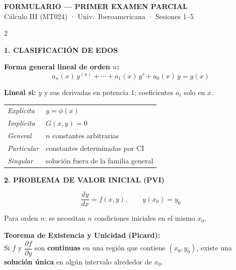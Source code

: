 \documentclass[10pt,letterpaper]{article}
\newcommand{\hdr}[2]{%
  \vspace{5pt}%
  \noindent\colorbox{#1}{\parbox{\dimexpr\linewidth-2\fboxsep}{%
    \vspace{2pt}\centering\textbf{\small\color{white}\MakeUppercase{#2}}\vspace{2pt}%
  }}\par\vspace{4pt}}
\newenvironment{caja}[1][ibero]{%
  \begin{mdframed}[linecolor=#1,linewidth=1pt,backgroundcolor=#1!8,
    innerleftmargin=5pt,innerrightmargin=5pt,
    innertopmargin=3pt,innerbottommargin=3pt,
    skipabove=4pt,skipbelow=4pt]
}{\end{mdframed}}
\begin{document}
\pagestyle{empty}

\noindent\colorbox{ibero}{\parbox{\linewidth}{%
  \vspace{4pt}\centering
  {\large\bfseries\color{white}FORMULARIO — PRIMER EXAMEN PARCIAL}\\[2pt]
  {\small\color{white}Cálculo III (MT024) · Univ.\ Iberoamericana · Sesiones 1–5}
  \vspace{4pt}}}

\vspace{6pt}

\begin{multicols}{2}

\hdr{ibero}{1. Clasificación de EDOs}

\textbf{Forma general lineal de orden $n$:}
\[
  a_n(x)\,y^{(n)} + \cdots + a_1(x)\,y' + a_0(x)\,y = g(x)
\]

\textbf{Lineal si:} $y$ y sus derivadas en potencia 1; coeficientes $a_i$ solo en $x$.

\medskip
\begin{tabular}{@{}ll@{}}
  \textit{Explícita}  & $y = \phi(x)$ \\
  \textit{Implícita}  & $G(x,y) = 0$ \\
  \textit{General}    & $n$ constantes arbitrarias \\
  \textit{Particular} & constantes determinadas por CI \\
  \textit{Singular}   & solución fuera de la familia general \\
\end{tabular}

\hdr{ibero}{2. Problema de Valor Inicial (PVI)}

\[
  \frac{dy}{dx} = f(x,y), \qquad y(x_0) = y_0
\]

Para orden $n$: se necesitan $n$ condiciones iniciales en el mismo $x_0$.

\begin{caja}[ibero]
\textbf{Teorema de Existencia y Unicidad (Picard):}\\
Si $f$ y $\dfrac{\partial f}{\partial y}$ son \textbf{continuas} en una región que contiene $(x_0,y_0)$,
existe una \textbf{solución única} en algún intervalo alrededor de $x_0$.
\end{caja}


\end{multicols}
\end{document}
